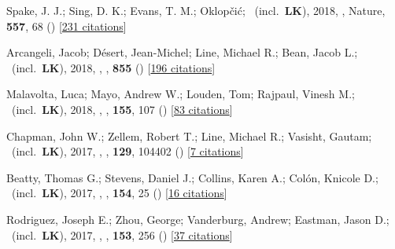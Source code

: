\item[{\color{numcolor}\scriptsize19}] Spake, J. J.; Sing, D. K.; Evans, T. M.; Oklop{\v{c}}i{\'c}; \etal\ (incl.\ \textbf{LK}), 2018, , Nature, \textbf{557}, 68 () [\href{https://ui.adsabs.harvard.edu/abs/2018Natur.557...68S}{231 citations}]

\item[{\color{numcolor}\scriptsize18}] Arcangeli, Jacob; D{\'e}sert, Jean-Michel; Line, Michael R.; Bean, Jacob L.; \etal\ (incl.\ \textbf{LK}), 2018, , \apj, \textbf{855} () [\href{https://ui.adsabs.harvard.edu/abs/2018ApJ...855L..30A}{196 citations}]

\item[{\color{numcolor}\scriptsize17}] Malavolta, Luca; Mayo, Andrew W.; Louden, Tom; Rajpaul, Vinesh M.; \etal\ (incl.\ \textbf{LK}), 2018, , \aj, \textbf{155}, 107 () [\href{https://ui.adsabs.harvard.edu/abs/2018AJ....155..107M}{83 citations}]

\item[{\color{numcolor}\scriptsize16}] Chapman, John W.; Zellem, Robert T.; Line, Michael R.; Vasisht, Gautam; \etal\ (incl.\ \textbf{LK}), 2017, , \pasp, \textbf{129}, 104402 () [\href{https://ui.adsabs.harvard.edu/abs/2017PASP..129j4402C}{7 citations}]

\item[{\color{numcolor}\scriptsize15}] Beatty, Thomas G.; Stevens, Daniel J.; Collins, Karen A.; Col{\'o}n, Knicole D.; \etal\ (incl.\ \textbf{LK}), 2017, , \aj, \textbf{154}, 25 () [\href{https://ui.adsabs.harvard.edu/abs/2017AJ....154...25B}{16 citations}]

\item[{\color{numcolor}\scriptsize14}] Rodriguez, Joseph E.; Zhou, George; Vanderburg, Andrew; Eastman, Jason D.; \etal\ (incl.\ \textbf{LK}), 2017, , \aj, \textbf{153}, 256 () [\href{https://ui.adsabs.harvard.edu/abs/2017AJ....153..256R}{37 citations}]

